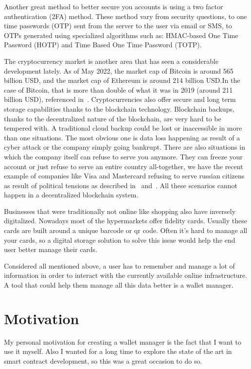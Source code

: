 \documentclass[a4paper,12pt]{report}
\begin{document}
Another great method to better secure you accounts is using a two factor
authentication (2FA) method. These method vary from security questions, to one
time passwords (OTP) sent from the server to the user via email or SMS, to OTPs
generated using specialized algorithms such as: HMAC-based One Time Password
(HOTP)\cite{hotp} and Time Based One Time Password (TOTP)\cite{totp}.

The cryptocurrency market is another area that has seen a considerable
development lately. As of May 2022, the market cap of Bitcoin is around 565
billion USD, and the market cap of Ethereum is around 214 billion USD.\@ In the
case of Bitcoin, that is more than double of what it was in 2019 (around 211
billion USD), referenced in~\cite{cryptocurrencyMarketAnalysis}.
Cryptocurrencies also offer secure and long term storage capabilities thanks to
the blockchain technology. Blockchain backups, thanks to the decentralized
nature of the blockchain, are very hard to be tempered with. A traditional
cloud backup could be lost or inaccessible in more than one situations. The
most obvious one is data loss happening as result of a cyber attack or the
company simply going bankrupt. There are also situations in which the company
itself can refuse to serve you anymore. They can freeze your account or just
refuse to serve an entire country all-together, we have the recent example of
companies like Visa and Mastercard refusing to serve russian citizens as result
of political tensions as described in~\cite{russiaSanctions}
and~\cite{russiaSanctions2}. All these scenarios cannot happen in a
decentralized blockchain system.

Businesses that were traditionally not online like shopping also have inversely
digitalized. Nowadays most of the hypermarkets offer fidelity cards. Usually
these cards are built around a unique barcode or qr code. Often it's hard to
manage all your cards, so a digital storage solution to solve this issue would
help the end user better manage their cards.

Considered all mentioned above, a user has to remember and manage a lot of
information in order to interact with the currently available online
infrastructure. A tool that could help them manage all this data better is a
wallet manager.

\section{Motivation}

My personal motivation for creating a wallet manager is the fact that I want to
use it myself. Also I wanted for a long time to explore the state of the art in
smart contract development, so this was a great occasion to do so.
\end{document}
